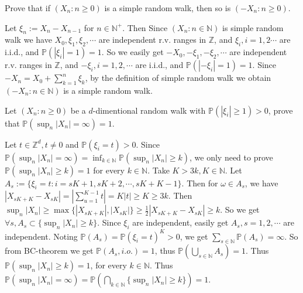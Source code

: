\documentclass{ctexart}
\newif\ifpreface
\begin{document}
\large
\setlength{\baselineskip}{1.2em}
\ifpreface
  
\else
  \maketitle
\fi
{}

\begin{problem}\label{pro:1}
  Prove that if \((X_n:n \geq 0)\) is a simple random walk, then so is \((-X_n:n \geq 0)\).
\end{problem}

\begin{solution}
  Let \(\xi_n:=X_n-X_{n-1}\) for \(n \in \mathbb{N}^+\). Then Since \((X_n:n \in \mathbb{N})\) is simple random walk we have
  \(X_0,\xi_1,\xi_2,\cdots\) are independent r.v. ranges in \(\mathbb{Z}\), and
  \(\xi_i,i=1,2\cdots\) are i.i.d., and \(\mathbb{P}(|\xi_i|=1)=1\).
  So we easily get \(-X_0,-\xi_1,-\xi_2,\cdots\) are independent r.v. ranges in \(\mathbb{Z}\),
  and \(-\xi_i,i=1,2,\cdots\) are i.i.d., and \(\mathbb{P}(|-\xi_i|=1)=1\).
  Since \(-X_n=X_0+\sum_{k=1}^{n}\xi_k\), by the definition of simple random walk we obtain \((-X_n:n \in \mathbb{N})\) is a simple random walk.
\end{solution}

\begin{problem}\label{pro:2}
  Let \((X_n:n \geq 0)\) be a \(d\)-dimentional random walk with \(\mathbb{P}(|\xi_i|\geq 1)>0\), prove that \(\mathbb{P}(\sup_{n}|X_n|=\infty)=1\).
\end{problem}
\begin{solution}
  Let \(t \in \mathbb{Z}^d,t \neq 0\) and \(\mathbb{P}(\xi_i=t)>0\).
  Since \(\mathbb{P}(\sup_{n}|X_n|=\infty)=\inf_{k \in \mathbb{N}}\mathbb{P}(\sup_{n}|X_n| \geq k)\),
  we only need to prove \(\mathbb{P}(\sup_{n}|X_n|\geq k)=1\) for every \(k \in \mathbb{N}\).
  Take \(K>3k,K \in \mathbb{N}\).
  Let \(A_s:=\{\xi_i=t:i=sK+1,sK+2,\cdots,sK+K-1\}\).
  Then for \(\omega \in A_s\), we have \(|X_{sK+K}-X_{sK}|=|\sum_{u=1}^{K-1} t|=K|t|\geq K \geq 3k\).
  Then \(\sup_n|X_n|\geq \max\{|X_{sK+K}|,|X_{sK}|\}\geq \frac{1}{2}|X_{sK+K}-X_{sK}|\geq k\).
  So we get \(\forall s,A_s \subset \{\sup_n|X_n| \geq k\}\).
  Since \(\xi_i\) are independent, easily get \(A_s,s=1,2,\cdots\) are independent.
  Noting \(\mathbb{P}(A_s)=\mathbb{P}(\xi_i=t)^K>0\), we get \(\sum_{s \in \mathbb{N}} \mathbb{P}(A_s)=\infty\).
  So from BC-theorem we get \(\mathbb{P}(A_s,i.o.)=1\), thus \(\mathbb{P}(\bigcup_{s \in \mathbb{N}}A_s)=1\).
  Thus \(\mathbb{P}(\sup_n|X_n| \geq k)=1\), for every \(k \in \mathbb{N}\).
  Thus \(\mathbb{P}(\sup_n|X_n|=\infty)=\mathbb{P}(\bigcap_{k \in \mathbb{N}}\{\sup_n|X_n|\geq k\})=1\).
\end{solution}
\end{document}
